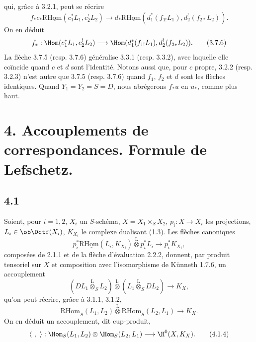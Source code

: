 qui, grâce à 3.2.1, peut se récrire
\begin{equation}
f_*c_*\mathrm{R}\underline{\mathrm{Hom}}(c_1^*L_1,c_2^!L_2)
\longrightarrow
 d_*\mathrm{R}\underline{\mathrm{Hom}}(d_1^*(f_{1!}L_1),d_2^!(f_{2*}L_2)).
\tag{3.7.5}
\end{equation}
On en déduit
\begin{equation}
f_*:\Hom(c_1^*L_1,c_2^!L_2)
\longrightarrow
\Hom(d_1^*(f_{1!}L_1),d_2^!(f_{2*}L_2)).
\tag{3.7.6}
\end{equation}
La flèche 3.7.5 (resp. 3.7.6) généralise 3.3.1 (resp. 3.3.2), avec laquelle elle coïncide quand $c$ et $d$ sont l'identité. Notons aussi que, pour $c$ propre, 3.2.2 (resp. 3.2.3) n'est autre que 3.7.5 (resp. 3.7.6) quand $f_1$, $f_2$ et $d$ sont les flèches identiques. Quand $Y_1=Y_2=S=D$, nous abrégerons $f_*u$ en $u_*$, comme plus haut.

\section*{4. Accouplements de correspondances. Formule de Lefschetz.}

\subsection*{4.1}
Soient, pour $i=1,2$, $X_i$ un $S$-schéma, $X=X_1\times_SX_2$, $p_i:X\to X_i$ les projections, $L_i\in\ob\Dctf(X_i)$, $K_{X_i}$ le complexe dualisant (1.3). Les flèches canoniques
\begin{equation}
p_i^*\mathrm{R}\underline{\mathrm{Hom}}(L_i,K_{X_i})\overset{\mathrm{L}}{\otimes}p_i^*L_i
\longrightarrow p_i^*K_{X_i},
\tag{4.1.1}
\end{equation}
composées de 2.1.1 et de la flèche d'évaluation 2.2.2, donnent, par produit tensoriel sur $X$ et composition avec l'isomorphisme de Künneth 1.7.6, un accouplement
\begin{equation}
(DL_1\overset{\mathrm{L}}{\otimes}_S L_2)\overset{\mathrm{L}}{\otimes}(L_1\overset{\mathrm{L}}{\otimes}_S DL_2)
\longrightarrow K_X,
\tag{4.1.2}
\end{equation}
qu'on peut récrire, grâce à 3.1.1, 3.1.2,
\begin{equation}
\mathrm{R}\underline{\mathrm{Hom}}_S(L_1,L_2)\overset{\mathrm{L}}{\otimes}\mathrm{R}\underline{\mathrm{Hom}}_S(L_2,L_1)
\longrightarrow K_X.
\tag{4.1.3}
\end{equation}
On en déduit un accouplement, dit cup-produit,
\begin{equation}
\langle\ ,\ \rangle:\Hom_S(L_1,L_2)\otimes\Hom_S(L_2,L_1)
\longrightarrow \H^0(X,K_X).
\tag{4.1.4}
\end{equation}


